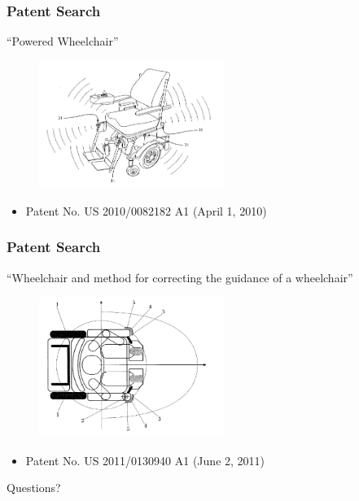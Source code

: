 \documentclass{beamer}
\begin{document}
\begin{frame}
  \frametitle{Patent Search}
  ``Powered Wheelchair''
  \begin{figure}
    \centering
    \includegraphics[width=6cm]{patents2.png}
  \end{figure}
  \begin{itemize}
    \item Patent No. US 2010/0082182 A1 (April 1, 2010) \\
  \end{itemize}
\end{frame}

\begin{frame}
  \frametitle{Patent Search}
  ``Wheelchair and method for correcting the guidance of a wheelchair''
  \begin{figure}
    \centering
    \includegraphics[width=6cm]{patents3.png}
  \end{figure}
  \begin{itemize}
    \item Patent No. US 2011/0130940 A1 (June 2, 2011) \\
  \end{itemize}
\end{frame}

\begin{frame}
  \begin{center}
    \Huge{Questions?}
  \end{center}
\end{frame}
\end{document}
